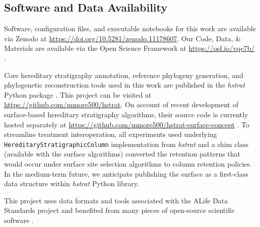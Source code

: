 \subsection{Software and Data Availability}


Software, configuration files, and executable notebooks for this work are available via Zenodo at \url{https://doi.org/10.5281/zenodo.11178607}.
Our Code, Data, \& Materials are available via the Open Science Framework at \url{https://osf.io/vqe7b/} \citep{moreno2024supplemental,foster2017open}.

Core hereditary stratigraphy annotation, reference phylogeny generation, and phylogenetic reconstruction tools used in this work are published in the \textit{hstrat} Python package \citep{moreno2022hstrat}.
This project can be visited at \url{https://github.com/mmore500/hstrat}.
On account of recent development of surface-based hereditary stratigraphy algorithms, their source code is currently hosted separately at \url{https://github.com/mmore500/hstrat-surface-concept} \citep{moreno2024hsurf}.
To streamline treatment interoperation, all experiments used underlying \texttt{HereditaryStratigraphicColumn} implementation from \textit{hstrat} and a shim class (available with the surface algorithms) converted the retention patterns that would occur under surface site selection algorithms to column retention policies.
In the medium-term future, we anticipate publishing the surface as a first-class data structure within \textit{hstrat} Python library.

This project uses data formats and tools associated with the ALife Data Standards project \citep{lalejini2019data} and benefited from many pieces of open-source scientific software \citep{sand2014tqdist,2020SciPy-NMeth,harris2020array,reback2020pandas,mckinney-proc-scipy-2010,sukumaran2010dendropy,cock2009biopython,torchiano2016effsize,waskom2021seaborn,hunter2007matplotlib,moreno2024apc,moreno2024qspool,moreno2023teeplot,hagen2021gen3sis,torchiano2016effsize}.
